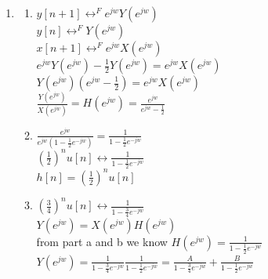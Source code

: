 \documentclass[10pt,a4paper, margin=1in]{article}
\begin{document}
\begin{enumerate}
    \item %
          \begin{enumerate}
              \item %
              $y[n+1] \leftrightarrow^F e^{jw}Y(e^{jw})$ \\

              $y[n] \leftrightarrow^F Y(e^{jw})$ \\

              $x[n+1] \leftrightarrow^F e^{jw}X(e^{jw})$ \\

              $e^{jw} Y(e^{jw}) - \frac{1}{2} Y(e^{jw}) = e^{jw} X(e^{jw})$\\

              $Y(e^{jw}) (e^{jw} - \frac{1}{2}) = e^{jw} X(e^{jw })$ \\

              $\frac{Y(e^{jw})}{X(e^{jw})} = H(e^{jw}) = \frac{e^{jw}}{e^{jw} - \frac{1}{2}}$ \\

              \item %
            
              $\frac{e^{jw}}{e^{jw}(1 - \frac{1}{2} e^{-jw})} = \frac{1}{1 - \frac{1}{2}e^{-jw}}$ \\

              $(\frac{1}{2})^n u[n] \leftrightarrow \frac{1}{1 - \frac{1}{2}e^{-jw}}$ \\

              $h[n] = (\frac{1}{2})^n u[n]$

              \item %
              
              $(\frac{3}{4})^nu[n] \leftrightarrow \frac{1}{1-\frac{3}{4}e^{-jw}}$ \\

              $Y(e^{jw}) = X(e^{jw}) H(e^{jw})$ \\

              from part a and b we know $H(e^{jw}) = \frac{1}{1-\frac{1}{2}e^{-jw}}$ \\

              $Y(e^{jw}) = \frac{1}{1-\frac{3}{4}e^{-jw}} \frac{1}{1-\frac{1}{2}e^{-jw}} = \frac{A}{1-\frac{3}{4}e^{-jw}} + \frac{B}{1-\frac{1}{2}e^{-jw}}$\\


\end{enumerate}
\end{enumerate}
\end{document}
